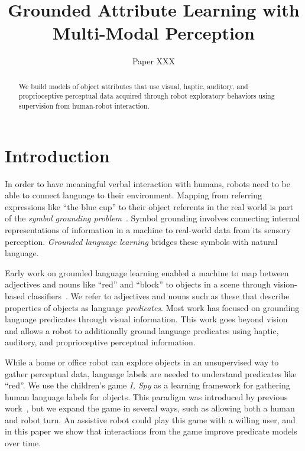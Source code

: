 \documentclass{article}
\title{Grounded Attribute Learning with Multi-Modal Perception}
\author{Paper XXX}
\newcommand{\ispy}{\textit{I, Spy} }
\begin{document}
\maketitle

\begin{abstract}
	We build models of object attributes that use visual, haptic, auditory, and proprioceptive perceptual data acquired through robot exploratory behaviors using supervision from human-robot interaction.
\end{abstract}

\section{Introduction}

	In order to have meaningful verbal interaction with humans, robots need to be able to connect language to their environment. 
	Mapping from referring expressions like ``the blue cup'' to their object referents in the real world is part of the \textit{symbol grounding problem}~\cite{harnad:phys90}. 
	Symbol grounding involves connecting internal representations of information in a machine to real-world data from its sensory perception. \textit{Grounded language learning} bridges these symbols with natural language. 

	Early work on grounded language learning enabled a machine to map between adjectives and nouns like ``red'' and ``block'' to objects in a scene through vision-based classifiers~\cite{roy:evocomm01}.
	We refer to adjectives and nouns such as these that describe properties of objects as language \textit{predicates}.
	Most work has focused on grounding language predicates through visual information.
	This work goes beyond vision and allows a robot to additionally ground language predicates using haptic, auditory, and proprioceptive perceptual information. 


	While a home or office robot can explore objects in an unsupervised way to gather perceptual data, language labels are needed to understand predicates like ``red''.
	We use the children's game \ispy as a learning framework for gathering human language labels for objects.
	This paradigm was introduced by previous work~\cite{parde:ijcai15}, but we expand the game in several ways, such as allowing both a human and robot turn.
	An assistive robot could play this game with a willing user, and in this paper we show that interactions from the game improve predicate models over time.
\end{document}
